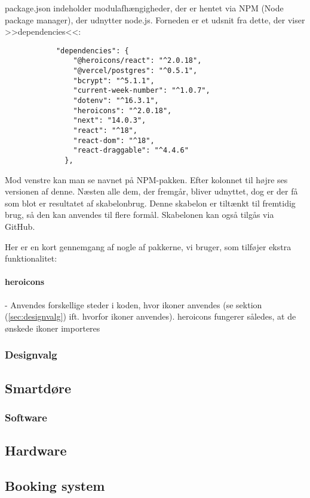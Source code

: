         package.json indeholder modulafhængigheder, der er hentet via NPM (Node package manager), der udnytter node.js. Forneden er et udsnit fra dette, der viser >>dependencies<<:
        \begin{lstlisting}
            "dependencies": {
                "@heroicons/react": "^2.0.18",
                "@vercel/postgres": "^0.5.1",
                "bcrypt": "^5.1.1",
                "current-week-number": "^1.0.7",
                "dotenv": "^16.3.1",
                "heroicons": "^2.0.18",
                "next": "14.0.3",
                "react": "^18",
                "react-dom": "^18",
                "react-draggable": "^4.4.6"
              }, 
        \end{lstlisting}

        Mod venstre kan man se navnet på NPM-pakken. Efter kolonnet til højre ses versionen af denne. Næsten alle dem, der fremgår, bliver udnyttet, dog er der få som blot er resultatet af skabelonbrug. Denne skabelon er tiltænkt til fremtidig brug, så den kan anvendes til flere formål. Skabelonen kan også tilgås via GitHub.

        Her er en kort gennemgang af nogle af pakkerne, vi bruger, som tilføjer ekstra funktionalitet:
        \paragraph{heroicons} - Anvendes forskellige steder i koden, hvor ikoner anvendes (se sektion (\ref{sec:designvalg}) ift. hvorfor ikoner anvendes). heroicons fungerer således, at de ønskede ikoner importeres

        \subsubsection{Designvalg \label{sec:designvalg}}
        \subsection{Smartdøre}
        \subsubsection{Software}
        \subsection{Hardware}
    \subsection{Booking system}

